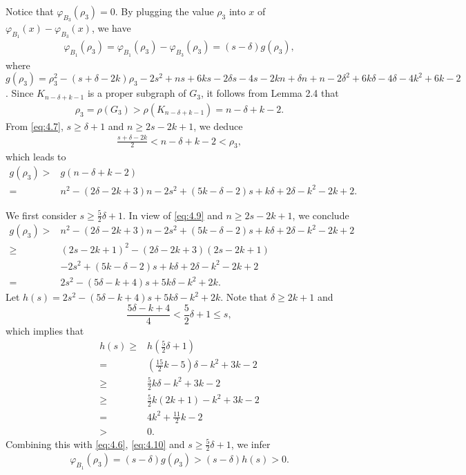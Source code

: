\documentclass[10pt]{article}
\numberwithin{equation}{section}
\begin{document}
Notice that $\varphi_{B_3}(\rho_3)=0$. By plugging the value $\rho_3$ into $x$ of $\varphi_{B_1}(x)-\varphi_{B_3}(x)$, we have
\begin{align}\label{eq:4.6}
\varphi_{B_1}(\rho_3)=\varphi_{B_1}(\rho_3)-\varphi_{B_3}(\rho_3)=(s-\delta)g(\rho_3),
\end{align}
where $g(\rho_3)=\rho_3^{2}-(s+\delta-2k)\rho_3-2s^{2}+ns+6ks-2\delta s-4s-2kn+\delta n+n-2\delta^{2}+6k \delta-4\delta-4k^{2}+6k-2$. Since
$K_{n-\delta+k-1}$ is a proper subgraph of $G_3$, it follows from Lemma 2.4 that
\begin{align}\label{eq:4.7}
\rho_3=\rho(G_3)>\rho(K_{n-\delta+k-1})=n-\delta+k-2.
\end{align}
From \eqref{eq:4.7}, $s\geq\delta+1$ and $n\geq2s-2k+1$, we deduce
\begin{align}\label{eq:4.8}
\frac{s+\delta-2k}{2}<n-\delta+k-2<\rho_3,
\end{align}
which leads to
\begin{align}\label{eq:4.9}
g(\rho_3)>&g(n-\delta+k-2)\nonumber\\
=&n^{2}-(2\delta-2k+3)n-2s^{2}+(5k-\delta-2)s+k\delta+2\delta-k^{2}-2k+2.
\end{align}

We first consider $s\geq\frac{5}{2}\delta+1$. In view of \eqref{eq:4.9} and $n\geq2s-2k+1$, we conclude
\begin{align}\label{eq:4.10}
g(\rho_3)>&n^{2}-(2\delta-2k+3)n-2s^{2}+(5k-\delta-2)s+k\delta+2\delta-k^{2}-2k+2\nonumber\\
\geq&(2s-2k+1)^{2}-(2\delta-2k+3)(2s-2k+1)\nonumber\\
&-2s^{2}+(5k-\delta-2)s+k\delta+2\delta-k^{2}-2k+2\nonumber\\
=&2s^{2}-(5\delta-k+4)s+5k\delta-k^{2}+2k.
\end{align}
Let $h(s)=2s^{2}-(5\delta-k+4)s+5k\delta-k^{2}+2k$. Note that $\delta\geq2k+1$ and
$$
\frac{5\delta-k+4}{4}<\frac{5}{2}\delta+1\leq s,
$$
which implies that
\begin{align*}
h(s)\geq&h\left(\frac{5}{2}\delta+1\right)\\
=&\left(\frac{15}{2}k-5\right)\delta-k^{2}+3k-2\\
\geq&\frac{5}{2}k\delta-k^{2}+3k-2\\
\geq&\frac{5}{2}k(2k+1)-k^{2}+3k-2\\
=&4k^{2}+\frac{11}{2}k-2\\
>&0.
\end{align*}
Combining this with \eqref{eq:4.6}, \eqref{eq:4.10} and $s\geq\frac{5}{2}\delta+1$, we infer
\begin{align}\label{eq:4.11}
\varphi_{B_1}(\rho_3)=(s-\delta)g(\rho_3)>(s-\delta)h(s)>0.
\end{align}
\end{document}
